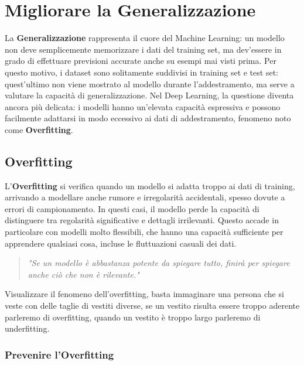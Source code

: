 \chapter{Migliorare la Generalizzazione}

La \textbf{Generalizzazione} rappresenta il cuore del Machine Learning: un modello non deve semplicemente memorizzare i dati del training set, ma dev’essere in grado di effettuare previsioni accurate anche su esempi mai visti prima. Per questo motivo, i dataset sono solitamente suddivisi in training set e test set: quest’ultimo non viene mostrato al modello durante l’addestramento, ma serve a valutare la capacità di generalizzazione. Nel Deep Learning, la questione diventa ancora più delicata: i modelli hanno un’elevata capacità espressiva e possono facilmente adattarsi in modo eccessivo ai dati di addestramento, fenomeno noto come \textbf{Overfitting}.

\section{Overfitting}

L’\textbf{Overfitting} si verifica quando un modello si adatta troppo ai dati di training, arrivando a modellare anche rumore e irregolarità accidentali, spesso dovute a errori di campionamento. In questi casi, il modello perde la capacità di distinguere tra regolarità significative e dettagli irrilevanti. Questo accade in particolare con modelli molto flessibili, che hanno una capacità sufficiente per apprendere qualsiasi cosa, incluse le fluttuazioni casuali dei dati.

\begin{quote}
\emph{"Se un modello è abbastanza potente da spiegare tutto, finirà per spiegare anche ciò che non è rilevante."}
\end{quote}

\begin{Osservazione}
    Visualizzare il fenomeno dell'overfitting, basta immaginare una persona che si veste con delle taglie di vestiti diverse, se un vestito risulta essere troppo aderente parleremo di overfitting, quando un vestito è troppo largo parleremo di underfitting.
\end{Osservazione}

\subsection{Prevenire l’Overfitting}

